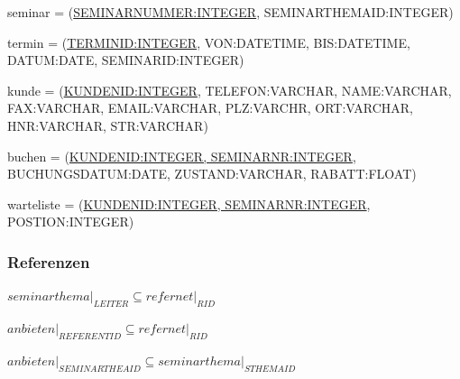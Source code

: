\documentclass[10pt,a4paper]{report}
\begin{document}
seminar = (\underline{SEMINARNUMMER:INTEGER}, SEMINARTHEMAID:INTEGER)

termin = (\underline{TERMINID:INTEGER}, VON:DATETIME, BIS:DATETIME, DATUM:DATE, SEMINARID:INTEGER)

kunde   = (\underline{KUNDENID:INTEGER}, TELEFON:VARCHAR, NAME:VARCHAR, FAX:VARCHAR, EMAIL:VARCHAR, PLZ:VARCHR, ORT:VARCHAR, HNR:VARCHAR, STR:VARCHAR)

buchen = (\underline{KUNDENID:INTEGER, SEMINARNR:INTEGER}, BUCHUNGSDATUM:DATE, ZUSTAND:VARCHAR, RABATT:FLOAT)

warteliste = (\underline{KUNDENID:INTEGER, SEMINARNR:INTEGER}, POSTION:INTEGER)

\subsubsection{Referenzen}
$seminarthema\vert_{LEITER} \subseteq refernet\vert_{RID}$

$anbieten\vert_{REFERENTID} \subseteq refernet\vert_{RID}$

$anbieten\vert_{SEMINARTHEAID} \subseteq seminarthema\vert_{STHEMAID}$
\end{document}
